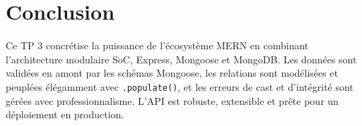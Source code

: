 \documentclass[12pt, a4paper]{article}
\begin{document}
\section*{Conclusion}
Ce TP 3 concrétise la puissance de l'écosystème MERN en combinant l'architecture modulaire SoC, Express, Mongoose et MongoDB. Les données sont validées en amont par les schémas Mongoose, les relations sont modélisées et peuplées élégamment avec \texttt{.populate()}, et les erreurs de cast et d'intégrité sont gérées avec professionnalisme. L'API est robuste, extensible et prête pour un déploiement en production.
\end{document}
